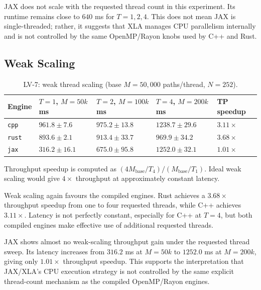 JAX does not scale with the requested thread count in this experiment.  Its
runtime remains close to \(640\) ms for \(T=1,2,4\).  This does not mean JAX
is single-threaded; rather, it suggests that XLA manages CPU parallelism
internally and is not controlled by the same OpenMP/Rayon knobs used by C++
and Rust.

\subsection{Weak Scaling}
\label{subsec:results-lv7-weak}

\begin{table}[htbp]
\centering
\small
\begin{threeparttable}
\caption{LV-7: weak thread scaling (base \(M=50{,}000\) paths/thread, \(N=252\)).}
\label{tab:lv7-weak-scaling}
\begin{tabularx}{\textwidth}{l>{\centering\arraybackslash}X>{\centering\arraybackslash}X>{\centering\arraybackslash}X>{\centering\arraybackslash}X}
\toprule
\textbf{Engine}
& \textbf{\(T=1\), \(M=50k\) ms}
& \textbf{\(T=2\), \(M=100k\) ms}
& \textbf{\(T=4\), \(M=200k\) ms}
& \textbf{TP speedup} \\
\midrule
\texttt{cpp}
& \(961.8\pm 7.6\)
& \(975.2\pm13.8\)
& \(1238.7\pm29.6\)
& \(3.11\times\) \\
\texttt{rust}
& \(893.6\pm 2.1\)
& \(913.4\pm33.7\)
& \(969.9\pm34.2\)
& \(3.68\times\) \\
\texttt{jax}
& \(316.2\pm16.1\)
& \(675.0\pm95.8\)
& \(1252.0\pm32.1\)
& \(1.01\times\) \\
\bottomrule
\end{tabularx}
\begin{tablenotes}
\footnotesize
\item Throughput speedup is computed as
\((4M_{\mathrm{base}}/T_4)/(M_{\mathrm{base}}/T_1)\).  Ideal weak scaling
would give \(4\times\) throughput at approximately constant latency.
\end{tablenotes}
\end{threeparttable}
\end{table}

Weak scaling again favours the compiled engines.  Rust achieves a
\(3.68\times\) throughput speedup from one to four requested threads, while
C++ achieves \(3.11\times\).  Latency is not perfectly constant, especially
for C++ at \(T=4\), but both compiled engines make effective use of
additional requested threads.

JAX shows almost no weak-scaling throughput gain under the requested thread
sweep.  Its latency increases from \(316.2\) ms at \(M=50k\) to \(1252.0\)
ms at \(M=200k\), giving only \(1.01\times\) throughput speedup.  This
supports the interpretation that JAX/XLA's CPU execution strategy is not
controlled by the same explicit thread-count mechanism as the compiled
OpenMP/Rayon engines.

